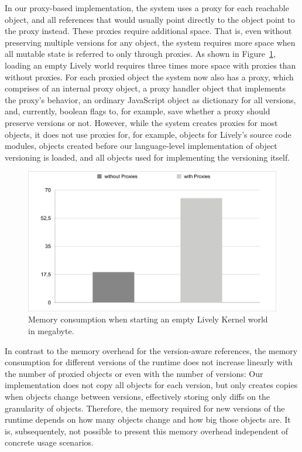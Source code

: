 In our proxy-based implementation, the system uses a proxy for each reachable object, and all references that would usually point directly to the object point to the proxy instead.
These proxies require additional space.
That is, even without preserving multiple versions for any object, the system requires more space when all mutable state is referred to only through proxies.
As shown in Figure~\ref{fig:MemoryOverhead}, loading an empty Lively world requires three times more space with proxies than without proxies.
For each proxied object the system now also has a proxy, which comprises of an internal proxy object, a proxy handler object that implements the proxy's behavior, an ordinary JavaScript object as dictionary for all versions, and, currently, boolean flags to, for example, save whether a proxy should preserve versions or not.
However, while the system creates proxies for most objects, it does not use proxies for, for example, objects for Lively's source code modules, objects created before our language-level implementation of object versioning is loaded, and all objects used for implementing the versioning itself. 

\begin{figure}[h]
    \centering
    \includegraphics[width=\textwidth]{figures/memoryOverhead.pdf}
    \caption{Memory consumption when starting an empty Lively Kernel world in megabyte.}
    \label{fig:MemoryOverhead}
\end{figure}

In contrast to the memory overhead for the version-aware references, the memory consumption for different versions of the runtime does not increase linearly with the number of proxied objects or even with the number of versions:
Our implementation does not copy all objects for each version, but only creates copies when objects change between versions, effectively storing only diffs on the granularity of objects.
Therefore, the memory required for new versions of the runtime depends on how many objects change and how big those objects are. 
It is, subsequentely, not possible to present this memory overhead independent of concrete usage scenarios.


